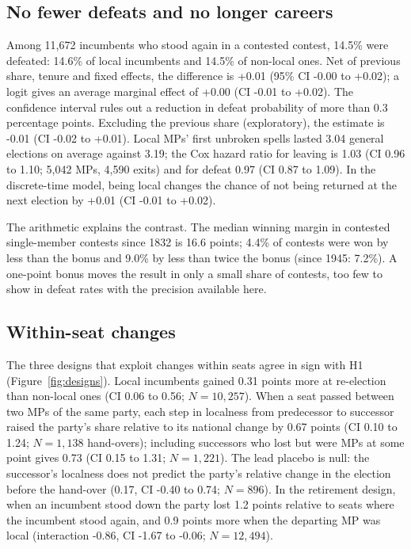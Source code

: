 \documentclass[11pt,a4paper]{article}
\begin{document}
\subsection{No fewer defeats and no longer careers}
Among 11{,}672 incumbents who stood again in a contested contest, 14.5\% were defeated: 14.6\% of local incumbents and 14.5\% of non-local ones. Net of previous share, tenure and fixed effects, the difference is +0.01 (95\% CI -0.00 to +0.02); a logit gives an average marginal effect of +0.00 (CI -0.01 to +0.02). The confidence interval rules out a reduction in defeat probability of more than 0.3 percentage points. Excluding the previous share (exploratory), the estimate is -0.01 (CI -0.02 to +0.01). Local MPs' first unbroken spells lasted 3.04 general elections on average against 3.19; the Cox hazard ratio for leaving is 1.03 (CI 0.96 to 1.10; 5{,}042 MPs, 4{,}590 exits) and for defeat 0.97 (CI 0.87 to 1.09). In the discrete-time model, being local changes the chance of not being returned at the next election by +0.01 (CI -0.01 to +0.02).

The arithmetic explains the contrast. The median winning margin in contested single-member contests since 1832 is 16.6 points; 4.4\% of contests were won by less than the bonus and 9.0\% by less than twice the bonus (since 1945: 7.2\%). A one-point bonus moves the result in only a small share of contests, too few to show in defeat rates with the precision available here.

\subsection{Within-seat changes}
The three designs that exploit changes within seats agree in sign with H1 (Figure~\ref{fig:designs}). Local incumbents gained 0.31 points more at re-election than non-local ones (CI 0.06 to 0.56; $N=10{,}257$). When a seat passed between two MPs of the same party, each step in localness from predecessor to successor raised the party's share relative to its national change by 0.67 points (CI 0.10 to 1.24; $N=1{,}138$ hand-overs); including successors who lost but were MPs at some point gives 0.73 (CI 0.15 to 1.31; $N=1{,}221$). The lead placebo is null: the successor's localness does not predict the party's relative change in the election before the hand-over (0.17, CI -0.40 to 0.74; $N=896$). In the retirement design, when an incumbent stood down the party lost 1.2 points relative to seats where the incumbent stood again, and 0.9 points more when the departing MP was local (interaction -0.86, CI -1.67 to -0.06; $N=12{,}494$).
\end{document}
